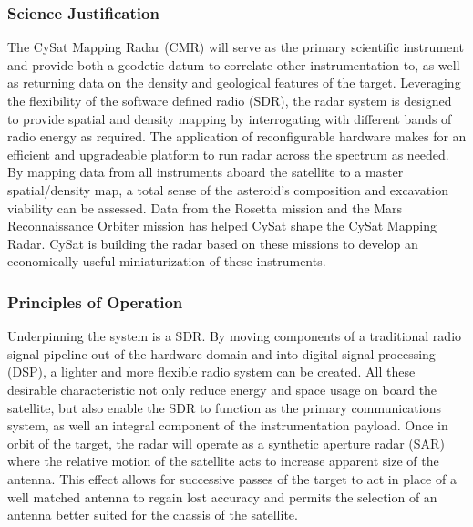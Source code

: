\documentclass[nocover]            %
{CSLI}                       %
\begin{document}
\subsubsection{Science Justification}
The CySat Mapping Radar (CMR) will serve as the primary scientific instrument and provide both a geodetic datum to correlate other instrumentation to, as well as returning data on the density and geological features of the target. Leveraging the flexibility of the software defined radio (SDR), the radar system is designed to provide spatial and density mapping by interrogating with different bands of radio energy as required. The application of reconfigurable hardware makes for an efficient and upgradeable platform to run radar across the spectrum as needed. By mapping data from all instruments aboard the satellite to a master spatial/density map, a total sense of the asteroid's composition and excavation viability can be assessed. Data from the Rosetta mission and the Mars Reconnaissance Orbiter mission has helped CySat shape the CySat Mapping Radar. CySat is building the radar based on these missions to develop an economically useful miniaturization of these instruments.
\subsubsection{Principles of Operation}
Underpinning the system is a SDR. By moving components of a traditional radio signal pipeline out of the hardware domain and into digital signal processing (DSP), a lighter and more flexible radio system can be created. All these desirable characteristic not only reduce energy and space usage on board the satellite, but also enable the SDR to function as the primary communications system, as well an integral component of the instrumentation payload.\newline
\indent Once in orbit of the target, the radar will operate as a synthetic aperture radar (SAR) where the relative motion of the satellite acts to increase apparent size of the antenna. This effect allows for successive passes of the target to act in place of a well matched antenna to regain lost accuracy and permits the selection of an antenna better suited for the chassis of the satellite.
\end{document}
